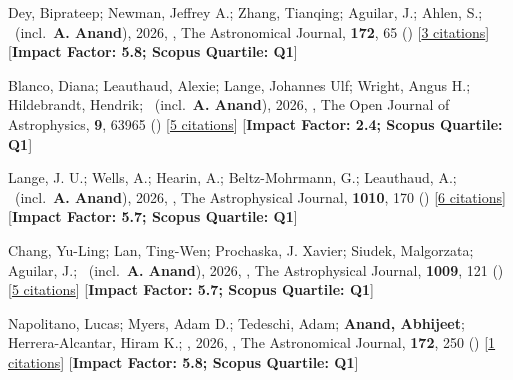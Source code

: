 \item[{\color{numcolor}\scriptsize42}] Dey, Biprateep; Newman, Jeffrey A.; Zhang, Tianqing; Aguilar, J.; Ahlen, S.; \etal\ (incl.\ \textbf{A. Anand}), 2026, , The Astronomical Journal, \textbf{172}, 65 () [\href{https://ui.adsabs.harvard.edu/abs/2026AJ....172...65D}{3 citations}] [\textbf{Impact Factor: 5.8; Scopus Quartile: Q1}]

\item[{\color{numcolor}\scriptsize41}] Blanco, Diana; Leauthaud, Alexie; Lange, Johannes Ulf; Wright, Angus H.; Hildebrandt, Hendrik; \etal\ (incl.\ \textbf{A. Anand}), 2026, , The Open Journal of Astrophysics, \textbf{9}, 63965 () [\href{https://ui.adsabs.harvard.edu/abs/2026OJAp....963965B}{5 citations}] [\textbf{Impact Factor: 2.4; Scopus Quartile: Q1}]

\item[{\color{numcolor}\scriptsize40}] Lange, J. U.; Wells, A.; Hearin, A.; Beltz-Mohrmann, G.; Leauthaud, A.; \etal\ (incl.\ \textbf{A. Anand}), 2026, , The Astrophysical Journal, \textbf{1010}, 170 () [\href{https://ui.adsabs.harvard.edu/abs/2026ApJ..1010..170L}{6 citations}] [\textbf{Impact Factor: 5.7; Scopus Quartile: Q1}]

\item[{\color{numcolor}\scriptsize39}] Chang, Yu-Ling; Lan, Ting-Wen; Prochaska, J. Xavier; Siudek, Malgorzata; Aguilar, J.; \etal\ (incl.\ \textbf{A. Anand}), 2026, , The Astrophysical Journal, \textbf{1009}, 121 () [\href{https://ui.adsabs.harvard.edu/abs/2026ApJ..1009..121C}{5 citations}] [\textbf{Impact Factor: 5.7; Scopus Quartile: Q1}]

\item[{\color{numcolor}\scriptsize38}] Napolitano, Lucas; Myers, Adam D.; Tedeschi, Adam; \textbf{Anand, Abhijeet}; Herrera-Alcantar, Hiram K.; \etal, 2026, , The Astronomical Journal, \textbf{172}, 250 () [\href{https://ui.adsabs.harvard.edu/abs/2026AJ....172..250N}{1 citations}] [\textbf{Impact Factor: 5.8; Scopus Quartile: Q1}]

